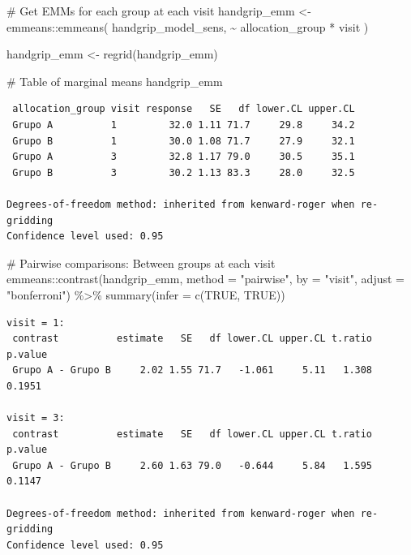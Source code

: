 \documentclass[
  letterpaper,
  DIV=11,
  numbers=noendperiod]{scrartcl}
\newenvironment{Shaded}{\begin{snugshade}}{\end{snugshade}}
\newcommand{\AttributeTok}[1]{\textcolor[rgb]{0.40,0.45,0.13}{#1}}
\newcommand{\CommentTok}[1]{\textcolor[rgb]{0.37,0.37,0.37}{#1}}
\newcommand{\ConstantTok}[1]{\textcolor[rgb]{0.56,0.35,0.01}{#1}}
\newcommand{\FunctionTok}[1]{\textcolor[rgb]{0.28,0.35,0.67}{#1}}
\newcommand{\NormalTok}[1]{\textcolor[rgb]{0.00,0.23,0.31}{#1}}
\newcommand{\OtherTok}[1]{\textcolor[rgb]{0.00,0.23,0.31}{#1}}
\newcommand{\SpecialCharTok}[1]{\textcolor[rgb]{0.37,0.37,0.37}{#1}}
\newcommand{\StringTok}[1]{\textcolor[rgb]{0.13,0.47,0.30}{#1}}
\begin{document}
\begin{Shaded}
\begin{Highlighting}[]
\CommentTok{\# Get EMMs for each group at each visit}
\NormalTok{handgrip\_emm }\OtherTok{\textless{}{-}}\NormalTok{ emmeans}\SpecialCharTok{::}\FunctionTok{emmeans}\NormalTok{(}
\NormalTok{    handgrip\_model\_sens, }
    \SpecialCharTok{\textasciitilde{}}\NormalTok{ allocation\_group }\SpecialCharTok{*}\NormalTok{ visit}
\NormalTok{)}

\NormalTok{handgrip\_emm }\OtherTok{\textless{}{-}} \FunctionTok{regrid}\NormalTok{(handgrip\_emm)}

\CommentTok{\# Table of marginal means}
\NormalTok{handgrip\_emm}
\end{Highlighting}
\end{Shaded}

\begin{verbatim}
 allocation_group visit response   SE   df lower.CL upper.CL
 Grupo A          1         32.0 1.11 71.7     29.8     34.2
 Grupo B          1         30.0 1.08 71.7     27.9     32.1
 Grupo A          3         32.8 1.17 79.0     30.5     35.1
 Grupo B          3         30.2 1.13 83.3     28.0     32.5

Degrees-of-freedom method: inherited from kenward-roger when re-gridding 
Confidence level used: 0.95 
\end{verbatim}

\begin{Shaded}
\begin{Highlighting}[]
\CommentTok{\# Pairwise comparisons: Between groups at each visit}
\NormalTok{emmeans}\SpecialCharTok{::}\FunctionTok{contrast}\NormalTok{(handgrip\_emm, }\AttributeTok{method =} \StringTok{"pairwise"}\NormalTok{, }\AttributeTok{by =} \StringTok{"visit"}\NormalTok{, }\AttributeTok{adjust =} \StringTok{"bonferroni"}\NormalTok{) }\SpecialCharTok{\%\textgreater{}\%} \FunctionTok{summary}\NormalTok{(}\AttributeTok{infer =} \FunctionTok{c}\NormalTok{(}\ConstantTok{TRUE}\NormalTok{, }\ConstantTok{TRUE}\NormalTok{))}
\end{Highlighting}
\end{Shaded}

\begin{verbatim}
visit = 1:
 contrast          estimate   SE   df lower.CL upper.CL t.ratio p.value
 Grupo A - Grupo B     2.02 1.55 71.7   -1.061     5.11   1.308  0.1951

visit = 3:
 contrast          estimate   SE   df lower.CL upper.CL t.ratio p.value
 Grupo A - Grupo B     2.60 1.63 79.0   -0.644     5.84   1.595  0.1147

Degrees-of-freedom method: inherited from kenward-roger when re-gridding 
Confidence level used: 0.95 
\end{verbatim}
\end{document}

